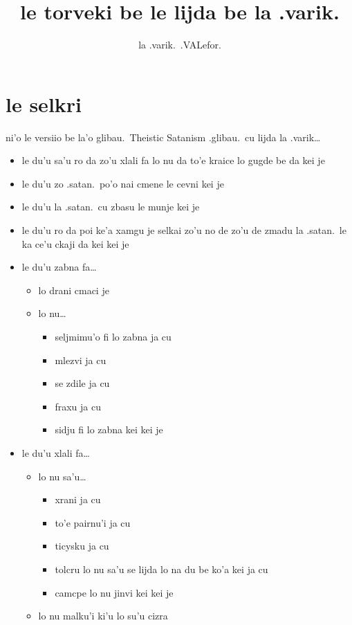 \documentclass{article}
\title{le torveki be le lijda be la .varik.}
\author{la .varik.\ .VALefor.}
\begin{document}
\maketitle

\section{le selkri}

ni'o le versiio be la'o glibau.\ Theistic Satanism .glibau.\ cu lijda la .varik\ldots

\begin{itemize}
	\item le du'u sa'u ro da zo'u xlali fa lo nu da to'e kraice lo gugde be da kei je
	\item le du'u zo .satan.\ po'o nai cmene le cevni kei je
	\item le du'u la .satan.\ cu zbasu le munje kei je
	\item le du'u ro da poi ke'a xamgu je selkai zo'u no de zo'u de zmadu la .satan.\ le ka ce'u ckaji da kei kei je
	\item le du'u zabna fa\ldots{}
	\begin{itemize}
		\item lo drani cmaci je
		\item lo nu\ldots{}
		\begin{itemize}
			\item seljmimu'o fi lo zabna ja cu
			\item mlezvi ja cu
			\item se zdile ja cu
			\item fraxu ja cu
			\item sidju fi lo zabna kei kei je
		\end{itemize}
	\end{itemize}
	\item le du'u xlali fa\ldots{}
	\begin{itemize}
		\item lo nu sa'u\ldots{}
		\begin{itemize}
			\item xrani ja cu
			\item to'e pairnu'i ja cu
			\item ticysku ja cu
			\item tolcru lo nu sa'u se lijda lo na du be ko'a kei ja cu
			\item camcpe lo nu jinvi kei kei je
		\end{itemize}
		\item lo nu malku'i ki'u lo su'u cizra
	\end{itemize}
\end{itemize}
\end{document}
